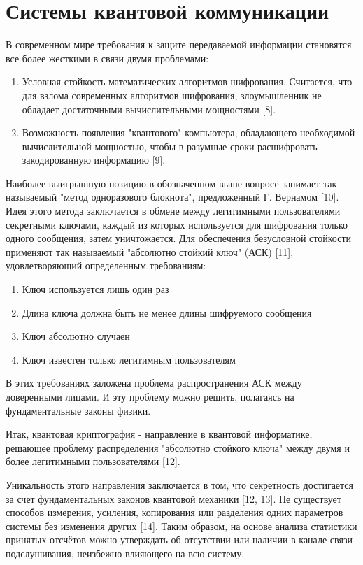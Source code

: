 \section{Системы квантовой коммуникации} \label{sec:ch1/sec2}

В современном мире требования к защите передаваемой  информации становятся все более жесткими в связи двумя проблемами:
\begin{enumerate}
	\item Условная стойкость математических алгоритмов шифрования.
Считается, что для взлома современных алгоритмов шифрования, злоумышленник не обладает достаточными вычислительными мощностями [8].
	\item Возможность появления "квантового" компьютера, обладающего необходимой вычислительной мощностью, чтобы в разумные сроки расшифровать закодированную информацию [9].
\end{enumerate} 


Наиболее выигрышную позицию в обозначенном выше вопросе занимает так называемый "метод одноразового блокнота", предложенный Г. Вернамом [10]. Идея этого метода заключается в обмене между легитимными пользователями секретными ключами, каждый из которых используется для шифрования только одного сообщения,  затем уничтожается. Для обеспечения безусловной стойкости применяют так называемый "абсолютно стойкий ключ" (АСК) [11], удовлетворяющий определенным требованиям:

\begin{enumerate}
	\item Ключ используется лишь один раз
	\item Длина ключа должна быть не менее длины шифруемого сообщения
	\item Ключ абсолютно случаен
	\item Ключ известен только легитимным пользователям
\end{enumerate}


В этих требованиях заложена проблема распространения АСК между доверенными лицами. И эту проблему можно решить, полагаясь на фундаментальные законы физики.


Итак, квантовая криптография - направление в квантовой информатике, решающее проблему распределения "абсолютно стойкого ключа" между двумя и более легитимными пользователями [12].


Уникальность этого направления заключается в том, что секретность достигается за счет фундаментальных законов квантовой механики [12, 13]. Не существует способов измерения, усиления, копирования или разделения одних параметров системы без изменения других [14]. Таким образом, на основе анализа статистики принятых отсчётов можно утверждать об отсутствии или наличии в канале связи подслушивания, неизбежно влияющего на всю систему.



